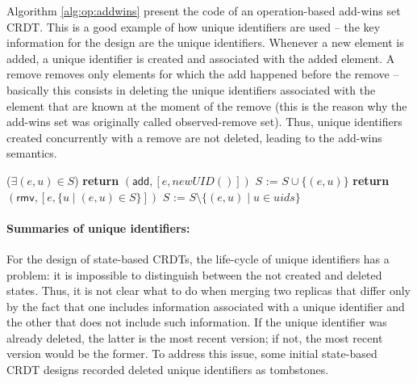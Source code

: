 \documentclass[11pt,a4paper]{article}
\begin{document}

Algorithm \ref{alg:op:addwins} present the code of an operation-based add-wins set CRDT.
This is a good example of how unique identifiers are used -- the key information for the 
design are the unique identifiers.
Whenever a new element is added, a unique identifier is created and associated with the 
added element.
A remove removes only elements for which the add happened before the remove -- basically
this consists in deleting the unique identifiers associated with the element 
that are known at the moment of the remove
(this is the reason why the add-wins set was originally called observed-remove set).
Thus, unique identifiers created concurrently with a remove are not deleted, leading 
to the add-wins semantics.

\begin{algorithm}
\caption{Operation-based Add-wins Set CRDT (adapted from \cite{Shapiro11Comprehensive})}
\label{alg:op:addwins}
\begin{algorithmic}[1]
 
\EndPayload
{}
\State \Return ($\exists (e,u) \in S$)
\EndQuery
{}
\State \textbf{return} $(\mathsf{add}, [e,\mathit{newUID}()])$
\EndAtSource
{}
\State $S$ := $S \cup \{(e,u)\}$
\EndDownstream
\EndUpdateOp
{}
\State \textbf{return} $(\mathsf{rmv}, [e,\{u \mid (e,u) \in S\}])$
\EndAtSource
{}
\State $S$ := $S \setminus \{(e,u) \mid u \in uids\}$
\EndDownstream
\EndUpdateOp
\end{algorithmic}
\end{algorithm}

\paragraph{Summaries of unique identifiers:}
For the design of state-based CRDTs, the life-cycle of unique identifiers has a problem:
it is impossible to distinguish between the not created and deleted states.
Thus, it is not clear what to do when merging two replicas that differ only by 
the fact that one includes information associated with a unique identifier 
and the other that does not include such information.
If the unique identifier was already deleted, the latter is the most recent
version; if not, the most recent version would be the former.
To address this issue, some initial state-based CRDT designs recorded deleted unique 
identifiers as tombstones.
\end{document}
